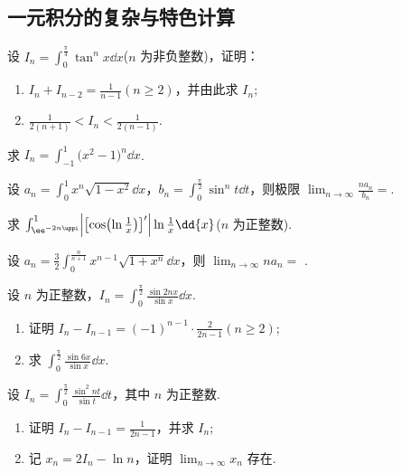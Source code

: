 \subsection{一元积分的复杂与特色计算}

	\begin{ti}
		设 $I_{n} = \int_{0}^{\frac{\uppi}{4}} \tan^{n}x \dd{x}$($n$ 为非负整数)，证明：
		\begin{enumerate}
			\item $I_{n} + I_{n-2} = \frac{1}{n - 1} (n \geq 2)$，并由此求 $I_{n}$;
			\item $\frac{1}{2(n + 1)} < I_{n} < \frac{1}{2(n - 1)}$.
		\end{enumerate}
	\end{ti}

	\begin{ti}
		求 $I_{n} = \int_{-1}^{1} \bigl( x^{2} - 1 \bigr)^{n} \dd{x}$.
	\end{ti}

	\begin{ti}
		设 $a_{n} = \int_{0}^{1} x^{n} \sqrt{1 - x^{2}} \dd{x}$，$b_{n} = \int_{0}^{\frac{\uppi}{2}} \sin^{n}t \dd{t}$，则极限 $\lim_{n \to \infty} \frac{n a_{n}}{b_{n}} = $\kuo.

	\end{ti}

	\begin{ti}
		求 $\int_{\ee^{-2 n \uppi}}^{1} \Bigl| \bigl[ \cos \bigl( \ln \frac{1}{x} \bigr) \bigr]' \Bigr| \ln \frac{1}{x} \dd{x}$($n$ 为正整数).
	\end{ti}

	\begin{ti}
		设 $a_{n} = \frac{3}{2} \int_{0}^{\frac{n}{n + 1}} x^{n-1} \sqrt{1 + x^{n}} \dd{x}$，则 $\lim_{n \to \infty} n a_{n} = $ \htwo.
	\end{ti}

	\begin{ti}
		设 $n$ 为正整数，$I_{n} = \int_{0}^{\frac{\uppi}{2}} \frac{\sin 2nx}{\sin x} \dd{x}$.
		\begin{enumerate}
			\item 证明 $I_{n} - I_{n-1} = (-1)^{n-1} \cdot \frac{2}{2n-1} (n \geq 2)$;
			\item 求 $\int_{0}^{\frac{\uppi}{2}} \frac{\sin 6x}{\sin x} \dd{x}$.
		\end{enumerate}
	\end{ti}

	\begin{ti}
		设 $I_{n} = \int_{0}^{\frac{\uppi}{2}} \frac{\sin^{2}nt}{\sin t} \dd{t}$，其中 $n$ 为正整数.
		\begin{enumerate}
			\item 证明 $I_{n} - I_{n-1} = \frac{1}{2n-1}$，并求 $I_{n}$;
			\item 记 $x_{n} = 2I_{n} - \ln n$，证明 $\lim_{n \to \infty} x_{n}$ 存在.
		\end{enumerate}
	\end{ti}

